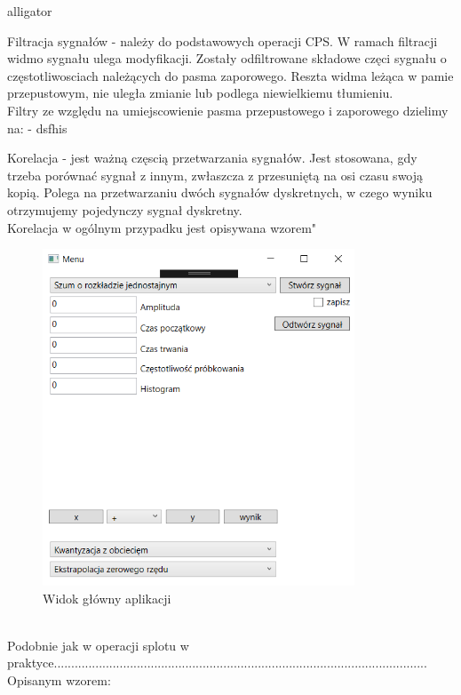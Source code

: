 \documentclass[12pt]{article}
\begin{document}
\begin{labeling}{alligator}
\item [Filtracja sygnałów]  - należy do podstawowych operacji CPS. W ramach filtracji widmo sygnału ulega modyfikacji. Zostały odfiltrowane składowe częci sygnału o częstotliwosciach należących do pasma zaporowego. Reszta widma leżąca w pamie przepustowym, nie uległa zmianie lub podlega niewielkiemu tłumieniu. 
\\Filtry ze względu na umiejscowienie pasma przepustowego i zaporowego dzielimy na:
 - dsfhis 

\item [Korelacja] - jest ważną częscią przetwarzania sygnałów. Jest stosowana, gdy trzeba porównać sygnał z innym, zwłaszcza z przesuniętą na osi czasu swoją kopią.
Polega na przetwarzaniu dwóch sygnałów dyskretnych, w czego wyniku otrzymujemy pojedynczy sygnał dyskretny.
\\Korelacja w ogólnym przypadku jest opisywana wzorem"
\begin{figure}[h!]
 \centering
 \includegraphics[width=9.3cm]{ui1.PNG}
 \vspace{-0.3cm}
 \caption{Widok główny aplikacji}
 \label{Widok_aplikacjis}
\end{figure}
\\Podobnie jak w operacji splotu w praktyce............................................................................................................
\\Opisanym wzorem:
\begin{figure}[h!]
 \centering

\end{figure}
\end{labeling}
\end{document}
